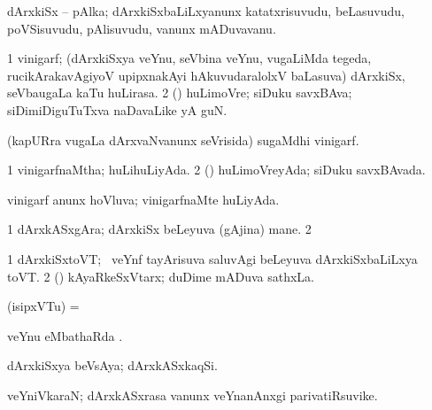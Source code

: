 {{{{{{\bentry
{} 
\gl{\nA}
\expl{}
\bmng
 dArxkiSx -- pAlka; dArxkiSxbaLiLxyanunx katatxrisuvudu, beLasuvudu, poVSisuvudu, pAlisuvudu, \mo vanunx mADuvavanu. 
\emng
\eentry

\bentry
{} 
\gl{\nA}
\expl{}
\bmng
\bnum
\num{1} vinigarf; (dArxkiSxya veYnu, seVbina veYnu, \mo vugaLiMda tegeda, rucikArakavAgiyoV upipxnakAyi hAkuvudaralolxV baLasuva) dArxkiSx, seVbaugaLa kaTu huLirasa. 
\num{2} (\rUpa) huLimoVre; siDuku savxBAva; siDimiDiguTuTxva naDavaLike yA guN. 
\enum
\emng

\noindent 
\gl{\pagu}
\expl{}
\bmng
{}  (kapURra \mo vugaLa dArxvaNvanunx seVrisida) sugaMdhi vinigarf. 
\emng
\eentry

\bentry 
{} 
\gl{\gu}
\expl{}
\bmng
\bnum
\num{1} vinigarfnaMtha; huLihuLiyAda. 
\num{2} (\rUpa) huLimoVreyAda; siDuku savxBAvada. 
\enum
\emng
\eentry

\bentry
{} 
\gl{\gu}
\expl{}
\bmng
 vinigarf anunx hoVluva; vinigarfnaMte huLiyAda. 
\emng
\eentry

\bentry
{} 
\gl{\nA}
\bmng
\bnum
\num{1} dArxkASxgAra; dArxkiSx beLeyuva (gAjina) mane. 
\num{2} 
\enum
\emng
\eentry

\bentry
{} 
\gl{\nA}
\expl{}
\bmng
\bnum
\num{1} dArxkiSxtoVT; \kanmu\ veYnf tayArisuva saluvAgi beLeyuva dArxkiSxbaLiLxya toVT. 
\num{2} (\beY) kAyaRkeSxVtarx; duDime mADuva sathxLa. 
\enum
\emng
\eentry

\bentry 
{} 
\gl{\nA}
\expl{\F\ }
\bmng
 (isipxVTu) =  
\emng
\eentry

\bentry
{} 
\gl{\sapUpa}
\expl{}
\bmng
 veYnu eMbathaRda \sapUpa. 
\emng
\eentry

\bentry
{} 
\gl{\nA}
\expl{}
\bmng
 dArxkiSxya beVsAya; dArxkASxkaqSi. 
\emng
\eentry

\bentry
{} 
\gl{\nA}
\expl{}
\bmng
 veYniVkaraN; dArxkASxrasa \mo vanunx veYnanAnxgi parivatiRsuvike. 
\emng
\eentry

\bentry 
{} 
\gl{\nA}
}}}}}}
